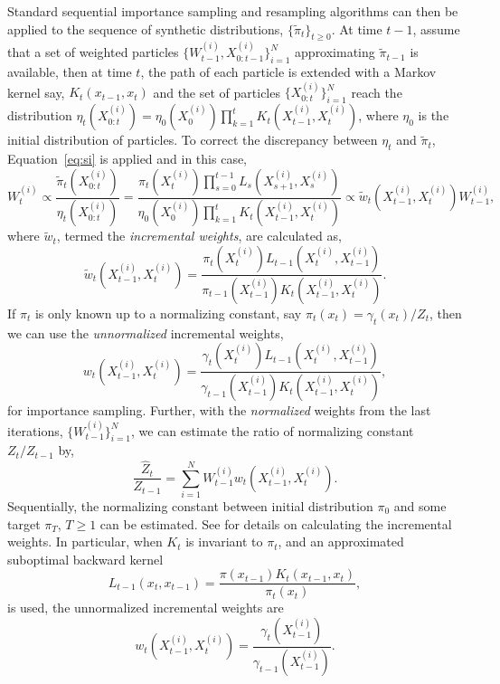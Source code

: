 \documentclass[11pt, fontset=Minion, showoverfull,
bib, biblatexstyle=numeric, mintcode, minted=cache]{marticle}
\begin{document}
Standard sequential importance sampling and resampling algorithms can then be
applied to the sequence of synthetic distributions, $\{\tilde\pi_t\}_{t\ge0}$.
At time $t - 1$, assume that a set of weighted particles
$\{W_{t-1}^{(i)},X_{0:t-1}^{(i)}\}_{i=1}^N$ approximating $\tilde\pi_{t-1}$ is
available, then at time $t$, the path of each particle is extended with a
Markov kernel say, $K_t(x_{t-1}, x_t)$ and the set of particles
$\{X_{0:t}^{(i)}\}_{i=1}^N$ reach the distribution $\eta_t(X_{0:t}^{(i)}) =
\eta_0(X_0^{(i)})\prod_{k=1}^tK_t(X_{t-1}^{(i)}, X_t^{(i)})$, where $\eta_0$
is the initial distribution of particles. To correct the discrepancy between
$\eta_t$ and $\tilde\pi_t$, Equation~\ref{eq:si} is applied and in this case,
\begin{equation}
  W_t^{(i)} \propto \frac{\tilde\pi_t(X_{0:t}^{(i)})}{\eta_t(X_{0:t}^{(i)})}
  = \frac{\pi_t(X_t^{(i)})\prod_{s=0}^{t-1}L_s(X_{s+1}^{(i)}, X_s^{(i)})}
  {\eta_0(X_0^{(i)})\prod_{k=1}^tK_t(X_{t-1}^{(i)},X_t^{(i)})}
  \propto \tilde{w}_t(X_{t-1}^{(i)}, X_t^{(i)})W_{t-1}^{(i)},
\end{equation}
where $\tilde{w}_t$, termed the \emph{incremental weights}, are calculated as,
\begin{equation}
  \tilde{w}_t(X_{t-1}^{(i)},X_t^{(i)}) =
  \frac{\pi_t(X_t^{(i)})L_{t-1}(X_t^{(i)}, X_{t-1}^{(i)})}
  {\pi_{t-1}(X_{t-1}^{(i)})K_t(X_{t-1}^{(i)}, X_t^{(i)})}.
\end{equation}
If $\pi_t$ is only known up to a normalizing constant, say $\pi_t(x_t) =
\gamma_t(x_t)/Z_t$, then we can use the \emph{unnormalized} incremental
weights,
\begin{equation}
  w_t(X_{t-1}^{(i)},X_t^{(i)}) =
  \frac{\gamma_t(X_t^{(i)})L_{t-1}(X_t^{(i)}, X_{t-1}^{(i)})}
  {\gamma_{t-1}(X_{t-1}^{(i)})K_t(X_{t-1}^{(i)}, X_t^{(i)})},
\end{equation}
for importance sampling. Further, with the \emph{normalized} weights from the
last iterations, $\{W_{t-1}^{(i)}\}_{i=1}^N$, we can estimate the ratio of
normalizing constant $Z_t/Z_{t-1}$ by,
\begin{equation}
  \frac{\hat{Z}_t}{Z_{t-1}} =
  \sum_{i=1}^N W_{t-1}^{(i)}w_t(X_{t-1}^{(i)},X_t^{(i)}).
\end{equation}
Sequentially, the normalizing constant between initial distribution $\pi_0$
and some target $\pi_T$, $T\ge1$ can be estimated. See \cite{DelMoral:2006hc}
for details on  calculating the incremental weights. In particular, when $K_t$
is invariant to $\pi_t$, and an approximated suboptimal backward kernel
\begin{equation}
  L_{t-1}(x_t, x_{t-1}) = \frac{\pi(x_{t-1})K_t(x_{t-1}, x_t)}{\pi_t(x_t)},
\end{equation}
is used, the unnormalized incremental weights are
\begin{equation}
  w_t(X_{t-1}^{(i)},X_t^{(i)}) =
  \frac{\gamma_t(X_{t-1}^{(i)})}{\gamma_{t-1}(X_{t-1}^{(i)})}.
  \label{eq:inc_weight_mcmc}
\end{equation}
\end{document}
